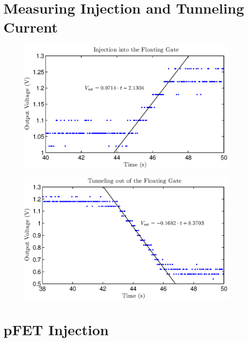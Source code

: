 

\newcommand{\reffig}[1]{Fig.~\ref{#1}}



\newpage
\section{Measuring Injection and Tunneling Current}
\begin{figure}[!htb]
    \center
    \includegraphics{exp1a.eps}
    \caption{}
    \label{fig:exp1a}
\end{figure}

\begin{figure}[!htb]
	\center
	\includegraphics{exp1b.eps}
	\caption{}
	\label{fig:exp1a}
\end{figure}

\section{pFET Injection}

